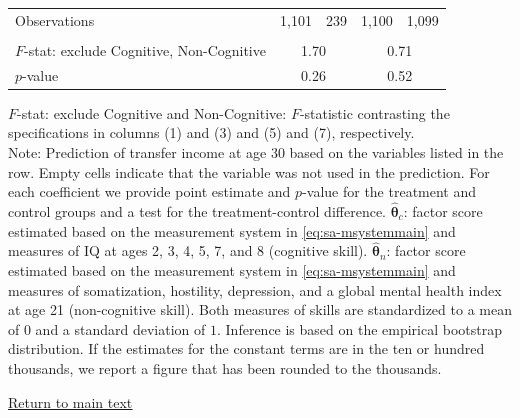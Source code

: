 \documentclass[static]{JJH-Beamer}
\begin{document}
\begin{frame}
\begin{table}[H]
\begin{center}
{\begin{tabular}{lcccccccc}
Observations &       \multicolumn{2}{c}{1,101} &              \multicolumn{2}{c}{239}  &       \multicolumn{2}{c}{1,100} &      \multicolumn{2}{c}{1,099}   \\  \\
\midrule
$F$-stat: exclude Cognitive, Non-Cognitive &                \multicolumn{4}{c}{1.70} &                 \multicolumn{4}{c}{0.71}   \\
$p$-value  &                \multicolumn{4}{c}{0.26} &                \multicolumn{4}{c}{0.52}    \\
\bottomrule
\end{tabular}
}
\end{center}
\tiny \flushleft
$F$-stat: exclude Cognitive and Non-Cognitive: $F$-statistic contrasting the specifications in columns (1) and (3) and (5) and (7), respectively.\\
Note: Prediction of transfer income at age 30 based on the variables listed in the row. Empty cells indicate that the variable was not used in the prediction. For each coefficient we provide point estimate and $p$-value for the treatment and control groups and a test for the treatment-control difference. $\hat{\bm{\theta}}_{c}$: factor score estimated based on the measurement system in \eqref{eq:sa-msystemmain} and measures of IQ at ages 2, 3, 4, 5, 7, and 8 (cognitive skill). $\hat{\bm{\theta}}_{n}$: factor score estimated based on the measurement system in \eqref{eq:sa-msystemmain} and measures of somatization, hostility, depression, and a global mental health index at age 21 (non-cognitive skill). Both measures of skills are standardized to a mean of $0$ and a standard deviation of $1$. Inference is based on the empirical bootstrap distribution. If the estimates for the constant terms are in the ten or hundred thousands, we report a figure that has been rounded to the thousands.\\
\end{table}

\end{frame}

\begin{frame}

\begin{center}
\hyperlink{ret:tarttarttart}{\underline{Return to main text}}
\end{center}

\end{frame}
\end{document}
